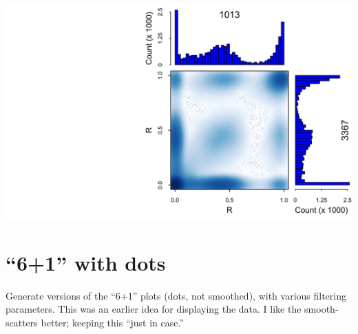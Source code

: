 \documentclass{article}\usepackage[]{graphicx}\usepackage[]{color}
\begin{document}
\noindent\includegraphics[width=\linewidth]{Fig1-mscat-figs/mscat-null-3-6.jpg}

\section{``6+1'' with dots}

Generate versions of the ``6+1'' plots (dots, not smoothed), with various filtering parameters.  This was an earlier idea for displaying the data.  I like the smooth-scatters better; keeping this ``just in case.''
\end{document}

